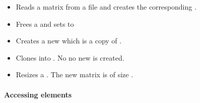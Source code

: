 \begin{itemize}
\item {}
  \sshortdescribe Reads a matrix from a file and creates the corresponding .  

\item {}
  \sshortdescribe Frees a  and sets  to  

\item {}
  \sshortdescribe Creates a new  which is a copy of
  .
  
\item {}
  \sshortdescribe Clones  into . No no new
   is created.

\item {}
  \sshortdescribe Resizes a . The new matrix is of size
  .  
\end{itemize}  


\paragraph{Accessing elements}

